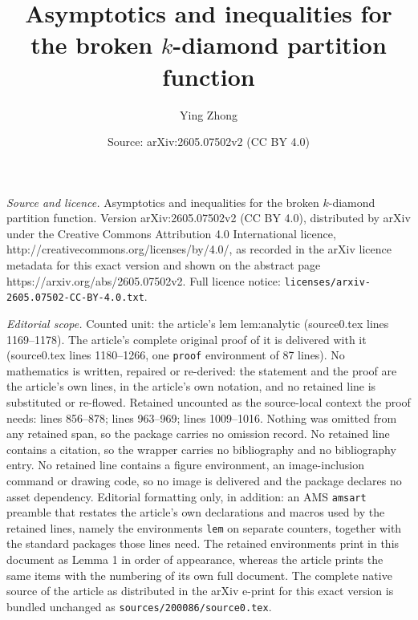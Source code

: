 \documentclass[10pt,a4paper]{amsart}
\title{Asymptotics and inequalities for the broken $k$-diamond partition function}
\author{Ying Zhong}
\date{Source: arXiv:2605.07502v2 (CC BY 4.0)}
\begin{document}
\maketitle

\noindent\emph{Source and licence.} Asymptotics and inequalities for the broken $k$-diamond partition function. Version arXiv:2605.07502v2 (CC BY 4.0), distributed by arXiv under the Creative Commons Attribution 4.0 International licence, http://creativecommons.org/licenses/by/4.0/, as recorded in the arXiv licence metadata for this exact version and shown on the abstract page https://arxiv.org/abs/2605.07502v2. Full licence notice: \texttt{licenses/arxiv-2605.07502-CC-BY-4.0.txt}.\par\smallskip

\noindent\textit{Editorial scope.} Counted unit: the article's lem lem:analytic (source0.tex lines 1169--1178). The article's complete original proof of it is delivered with it (source0.tex lines 1180--1266, one \texttt{proof} environment of 87 lines). No mathematics is written, repaired or re-derived: the statement and the proof are the article's own lines, in the article's own notation, and no retained line is substituted or re-flowed.  Retained uncounted as the source-local context the proof needs: lines 856--878; lines 963--969; lines 1009--1016.  Nothing was omitted from any retained span, so the package carries no omission record.  No retained line contains a citation, so the wrapper carries no bibliography and no bibliography entry.  No retained line contains a figure environment, an image-inclusion command or drawing code, so no image is delivered and the package declares no asset dependency.  Editorial formatting only, in addition: an AMS \texttt{amsart} preamble that restates the article's own declarations and macros used by the retained lines, namely the environments \texttt{lem} on separate counters, together with the standard packages those lines need.  The retained environments print in this document as Lemma 1 in order of appearance, whereas the article prints the same items with the numbering of its own full document.  The complete native source of the article as distributed in the arXiv e-print for this exact version is bundled unchanged as \texttt{sources/200086/source0.tex}.
\end{document}
